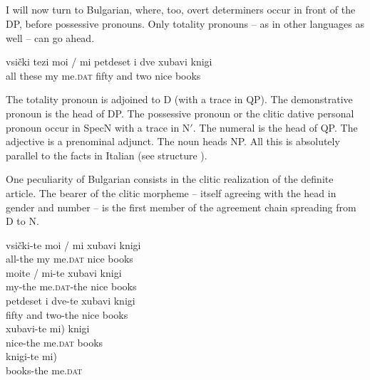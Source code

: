 \documentclass[output=paper,colorlinks,citecolor=brown]{langscibook}
\begin{document}
\subsection{} \label{sec:zi91:4.2}

I will now turn to Bulgarian, where, too, overt determiners occur in front of the DP, before possessive pronouns. Only totality pronouns -- as in other languages as well -- can go ahead.

\ea \label{ex:zi91:38}
    \gll vsički tezi moi / mi petdeset i dve xubavi knigi \\
    all these my {} me.\textsc{dat} fifty and two nice books \\
    \glt
\z

\noindent The totality pronoun is adjoined to D (with a trace in QP). The demonstrative pronoun is the head of DP. The possessive pronoun or the clitic dative personal pronoun occur in SpecN with a trace in N$'$. The numeral is the head of QP. The adjective is a prenominal adjunct. The noun heads NP. All this is absolutely parallel to the facts in Italian (see structure ).

One peculiarity of Bulgarian consists in the clitic realization of the definite article. The bearer of the clitic morpheme -- itself agreeing with the head in gender and number -- is the first member of the agreement chain spreading from D to N.

\ea \label{ex:zi91:39}
    \ea \label{ex:zi91:39a}
        \gll vsički-te moi / mi xubavi knigi \\
        all-the my {} me.\textsc{dat} nice books \\
        \glt
    \ex \label{ex:zi91:39b}
        \gll moite / \minsp{*} mi-te xubavi knigi \\
        my-the {} {} me.\textsc{dat}-the nice books \\
        \glt
    \ex \label{ex:zi91:39c}
        \gll petdeset i dve-te xubavi knigi \\
        fifty and two-the nice books \\
        \glt
    \ex \label{ex:zi91:39d}
        \gll xubavi-te \minsp{(} mi) knigi \\
        nice-the {} me.\textsc{dat} books\\
        \glt
    \ex \label{ex:zi91:39e}
        \gll knigi-te \minsp{(} mi) \\
        books-the {} me.\textsc{dat} \\
        \glt
    \z
\z
\end{document}
